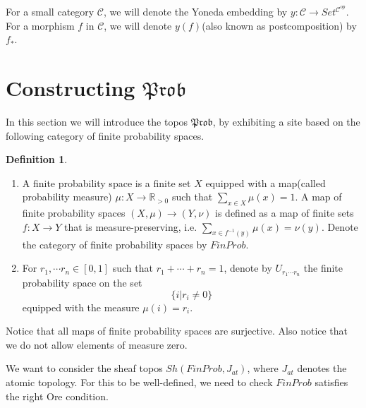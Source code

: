 \documentclass[a4paper]{amsproc}
\theoremstyle{plain}
\theoremstyle{definition}
\newtheorem{definition}[theorem]{Definition}
\theoremstyle{remark}
\numberwithin{equation}{section}
\begin{document}
For a small category $\mathcal{C}$, we will denote the Yoneda embedding by $y: \mathcal{C} \to Set^{\mathcal{C}^{op}}$. For a morphism $f$ in $\mathcal{C}$, we will denote $y(f)$(also known as postcomposition) by $f_*$.

\section{Constructing $\mathfrak{Prob}$}

In this section we will introduce the topos $\mathfrak{Prob}$, by exhibiting a site based on the following category of finite probability spaces.

\begin{definition}
\begin{enumerate}
\item A finite probability space is a finite set $X$ equipped with a map(called probability measure) $\mu: X \to \mathbb{R}_{>0}$ such that $\sum_{x \in X} \mu(x) = 1$. A map of finite probability spaces $(X,\mu) \to (Y,\nu)$ is defined as a map of finite sets $f: X \to Y$ that is measure-preserving, i.e. $\sum_{x \in f^{-1}(y)} \mu(x) = \nu(y)$. Denote the category of finite probability spaces by $FinProb$.
\item For $r_1, \cdots r_n \in [0,1]$ such that $r_1 + \cdots + r_n = 1$, denote by $U_{r_1 \cdots r_n}$ the finite probability space on the set 
\[
    \{i | r_i \neq 0 \}
\]
equipped with the measure $\mu(i) = r_i$.
\end{enumerate}
\end{definition}

Notice that all maps of finite probability spaces are surjective. Also notice that we do not allow elements of measure zero.

We want to consider the sheaf topos $Sh(FinProb, J_{at})$, where $J_{at}$ denotes the atomic topology. For this to be well-defined, we need to check $FinProb$ satisfies the right Ore condition.
\end{document}
